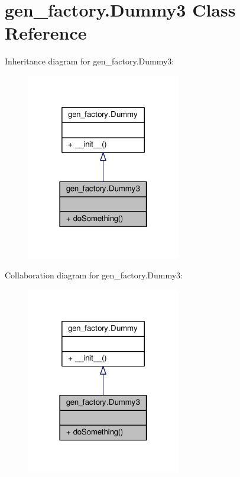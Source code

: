 \hypertarget{classgen__factory_1_1_dummy3}{}\section{gen\+\_\+factory.\+Dummy3 Class Reference}
\label{classgen__factory_1_1_dummy3}


Inheritance diagram for gen\+\_\+factory.\+Dummy3\+:\nopagebreak
\begin{figure}[H]
\begin{center}
\leavevmode
\includegraphics[width=190pt]{classgen__factory_1_1_dummy3__inherit__graph}
\end{center}
\end{figure}


Collaboration diagram for gen\+\_\+factory.\+Dummy3\+:\nopagebreak
\begin{figure}[H]
\begin{center}
\leavevmode
\includegraphics[width=190pt]{classgen__factory_1_1_dummy3__coll__graph}
\end{center}
\end{figure}
